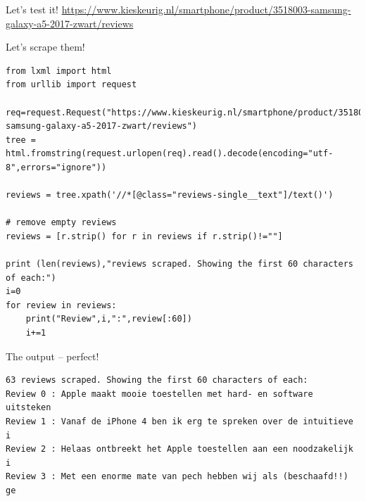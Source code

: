 \documentclass{beamer}
\begin{document}



\begin{frame}{Let's test it!}
	\large{\url{https://www.kieskeurig.nl/smartphone/product/3518003-samsung-galaxy-a5-2017-zwart/reviews}}
\end{frame}


\begin{frame}[fragile]{Let's scrape them!}
\begin{lstlisting}
from lxml import html
from urllib import request

req=request.Request("https://www.kieskeurig.nl/smartphone/product/3518003-samsung-galaxy-a5-2017-zwart/reviews")
tree = html.fromstring(request.urlopen(req).read().decode(encoding="utf-8",errors="ignore"))        

reviews = tree.xpath('//*[@class="reviews-single__text"]/text()')

# remove empty reviews
reviews = [r.strip() for r in reviews if r.strip()!=""]

print (len(reviews),"reviews scraped. Showing the first 60 characters of each:")
i=0
for review in reviews:
    print("Review",i,":",review[:60])
    i+=1
\end{lstlisting}
\end{frame}



\begin{frame}[fragile]{The output -- perfect!}
\begin{lstlisting}
63 reviews scraped. Showing the first 60 characters of each:
Review 0 : Apple maakt mooie toestellen met hard- en software uitsteken
Review 1 : Vanaf de iPhone 4 ben ik erg te spreken over de intuitieve i
Review 2 : Helaas ontbreekt het Apple toestellen aan een noodzakelijk i
Review 3 : Met een enorme mate van pech hebben wij als (beschaafd!!) ge
\end{lstlisting}
\end{frame}
\end{document}
